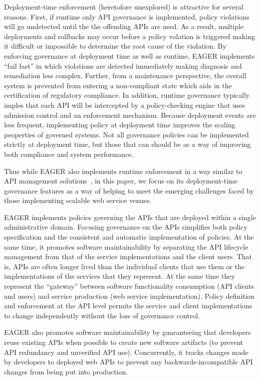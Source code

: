 Deployment-time enforcement (heretofore unexplored) is attractive for several
reasons.  First, if runtime only API governance is implemented, 
policy violations will go undetected until the the offending APIs are used.  
As a result, multiple deployments and rollbacks may occur before a policy
volation is triggered making it difficult or impossible to determine the root
cause of the violation.  By enforcing governance at deployment time as well as
runtime, EAGER implements ``fail fast'' in which violations are detected
immediately making diagnosis and remediation less complex.  
Further, from a maintenance perspective,  the overall
system is prevented from entering a non-compliant state which aids in the
certification of regulatory compliance.  In addition, runtime governance
typically imples that each API will be intercepted by a policy-checking engine
that uses admission control and an enforcement mechanism.  Because deployment
events are less frequent, implementing policy at deployment time improves the
scaling peoperties of governed systems.   Not all governance policies can be
implemented strictly at deployment time, but those that can should be as a way
of improving both compliance and system performance.

Thus while
EAGER also implements runtime
enforcement in a way similar to API management
solutions~\cite{wso2am,apigee,layer7,3scale}, in this paper, we focus
on its deployment-time governance features as a way of helping to meet the
emerging challenges faced by those
implementing scalable web service venues. 

EAGER implements policies governing the APIs that are 
deployed within a single administrative domain.  Focusing governance on
the APIs simplifies both policy specification and the consistent
and automatic implementation of policies.  At the same time, it promotes
software maintainability by separating the API lifecycle management from that
of the service implementations and the client users.  That is, APIs are often
longer lived than the individual clients that use them or the implementations
of the services that they represent.  At the same time they represent the
``gateway'' between software functionality consumption 
(API clients and users) and service
production (web service implementation).  Policy definition and enforcement at
the API level permits the service and client implementations to change
independently without the loss of governance control.

EAGER also promotes software maintainability by guaranteeing that 
developers reuse existing APIs when possible to create new software artifacts
(to prevent API redundancy and unverified API use). Concurrently, it
tracks changes made by developers to deployed web APIs to prevent
any backwards-incompatible API changes from being put into production.

